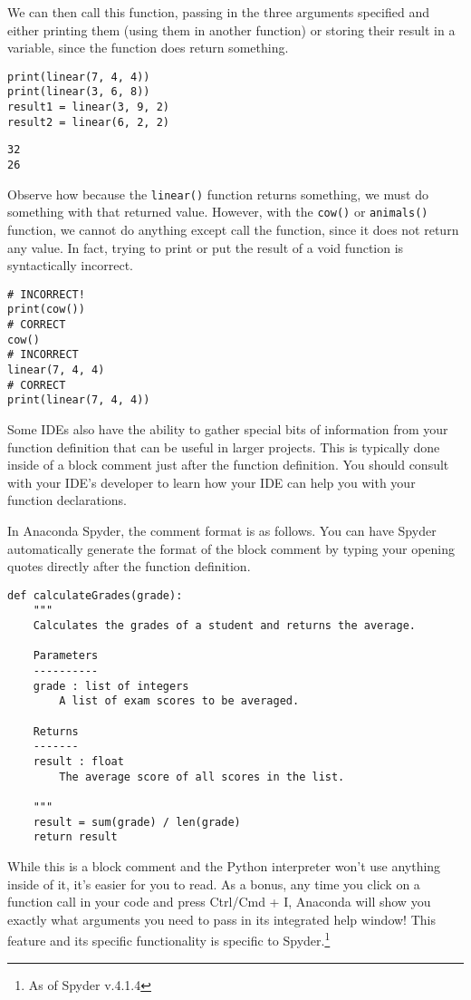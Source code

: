 We can then call this function, passing in the three arguments specified and either printing them (using them in another function) or storing their result in a variable, since the function does return something.
\begin{lstlisting}[style=pippython]
print(linear(7, 4, 4))
print(linear(3, 6, 8))
result1 = linear(3, 9, 2)
result2 = linear(6, 2, 2)
\end{lstlisting}
\begin{lstlisting}
32
26
\end{lstlisting}
Observe how because the \verb|linear()| function returns something, we must do something with that returned value. However, with the \verb|cow()| or \verb|animals()| function, we cannot do anything except call the function, since it does not return any value. In fact, trying to print or put the result of a void function is syntactically incorrect.\par
\begin{lstlisting}[style=pippython]
# INCORRECT!
print(cow())
# CORRECT
cow()
# INCORRECT
linear(7, 4, 4)
# CORRECT
print(linear(7, 4, 4))
\end{lstlisting}
Some IDEs also have the ability to gather special bits of information from your function definition that can be useful in larger projects. This is typically done inside of a block comment just after the function definition. You should consult with your IDE's developer to learn how your IDE can help you with your function declarations.\par
In Anaconda Spyder, the comment format is as follows. You can have Spyder automatically generate the format of the block comment by typing your opening quotes directly after the function definition.\par
\begin{lstlisting}[style=pippython]
def calculateGrades(grade):
    """
    Calculates the grades of a student and returns the average.

    Parameters
    ----------
    grade : list of integers
        A list of exam scores to be averaged.

    Returns
    -------
    result : float
        The average score of all scores in the list.

    """
    result = sum(grade) / len(grade)
    return result
\end{lstlisting}
While this is a block comment and the Python interpreter won't use anything inside of it, it's easier for you to read. As a bonus, any time you click on a function call in your code and press Ctrl/Cmd + I, Anaconda will show you exactly what arguments you need to pass in its integrated help window! This feature and its specific functionality is specific to Spyder.\footnote{As of Spyder v.4.1.4}\par
